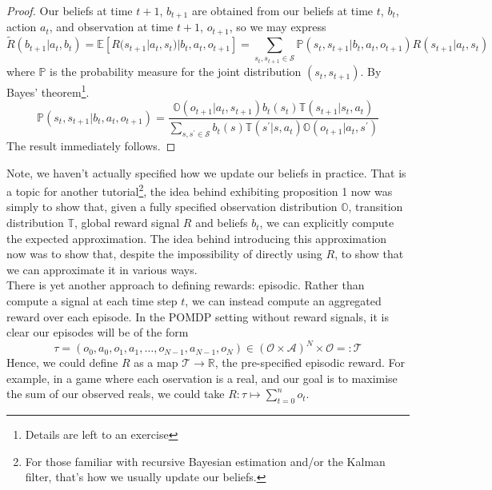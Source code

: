 \documentclass[12pt]{article}
\begin{document}
\begin{proof}
    Our beliefs at time $t+1$, $b_{t+1}$ are obtained from our beliefs at time $t$, $b_t$, action $a_t$, and observation at time 
    $t+1$, $o_{t+1}$, so we may express
    $$
    \tilde{R}(b_{t+1} | a_t, b_t)  = \mathbb{E}[R(s_{t+1} | a_t, s_t) | b_t, a_t, o_{t+1}] 
    = \sum_{s_t, s_{t+1} \in \mathcal{S}} \mathbb{P}(s_t, s_{t+1} | b_t, a_t, o_{t+1}) R(s_{t+1} | a_t, s_t)
    $$
    where $\mathbb{P}$ is the probability measure for the joint distribution $(s_t, s_{t+1})$. By Bayes' theorem\footnote{
    Details are left to an exercise}. 
    $$
    \mathbb{P}(s_t, s_{t+1} | b_t, a_t, o_{t+1}) 
    = \frac{\mathbb{O}(o_{t+1} | a_t, s_{t+1})b_t(s_t) \mathbb{T}(s_{t+1} | s_t, a_t)}
    {\sum_{s, s^\prime \in \mathcal{S}} b_t(s) \mathbb{T}(s^\prime | s, a_t) \mathbb{O}(o_{t+1} | a_t, s^\prime)} 
    $$
    The result immediately follows.     
\end{proof}

Note, we haven't actually specified how we update our beliefs in practice. That is a topic for another tutorial\footnote{
    For those familiar with recursive Bayesian estimation and/or the Kalman filter, that's how we usually update our beliefs.
}, the idea behind exhibiting proposition 1 now was simply to show that, given a fully specified observation distribution 
$\mathbb{O}$, transition distribution $\mathbb{T}$, global reward signal $R$ and beliefs $b_t$, we can explicitly compute the 
expected approximation. The idea behind introducing this approximation now was to show that, despite the impossibility of directly 
using $R$, to show that we can approximate it in various ways. \\ 

There is yet another approach to defining rewards: episodic. Rather than compute a signal at each time step $t$, we can instead 
compute an aggregated reward over each episode. In the POMDP setting without reward signals, it is clear our episodes will be 
of the form 
$$\tau = (o_0, a_0, o_1, a_1, \dots, o_{N-1}, a_{N-1}, o_N) \in (\mathcal{O} \times \mathcal{A})^N \times \mathcal{O} =: \mathcal{T}$$
Hence, we could define $R$ as a map $\mathcal{T} \to \mathbb{R}$, the pre-specified episodic reward. For example, in a game where 
each oservation is a real, and our goal is to maximise the sum of our observed reals, we could take $R: \tau \mapsto \sum_{t=0}^n o_t$. \\ 
\end{document}
